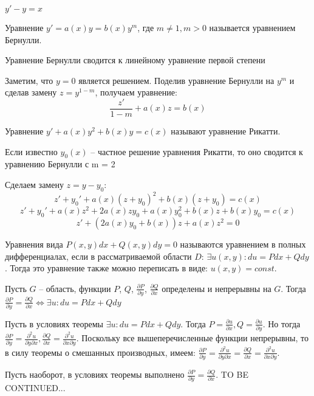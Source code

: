 \documentclass[document.tex]{subfiles}
\begin{document}
\begin{Example}
$y' - y = x$
\end{Example}
\begin{Definition}
Уравнение $y' = a(x)y = b(x)y^m$, где $m \neq 1, m > 0$ называется уравнением Бернулли.
\end{Definition}
\begin{Statement}
Уравнение Бернулли сводится к линейному уравнение первой степени
\end{Statement}
\begin{Proof}
Заметим, что $y = 0$ является решением. Поделив уравнение Бернулли на $y^m$ и сделав замену $z = y^{1-m}$, получаем уравнение:
$$\frac{z'}{1-m} + a(x)z = b(x)$$
\end{Proof}
\begin{Definition}
Уравнение $y' + a(x)y^2 + b(x)y = c(x)$ называют уравнение Рикатти.
\end{Definition}
\begin{Statement}
Если известно $y_0(x)$ -- частное решение уравнения Рикатти, то оно сводится к уравнению Бернулли с m = 2
\end{Statement}
\begin{Proof}
Сделаем замену $z = y - y_0$:
$$z' + y_0' + a(x)(z+y_0)^2 + b(x)(z+y_0) = c(x)$$
$$z' + y_0' + a(x)z^2 + 2a(x)zy_0 + a(x)y_0^2 + b(x)z + b(x)y_0 = c(x)$$
$$z' + (2a(x)y_0 + b(x))z + a(x)z^2 = 0$$
\end{Proof}
\begin{Definition}
Уравнения вида $P(x, y)dx + Q(x, y)dy = 0$ называются уравнением в полных дифференциалах, если в рассматриваемой области $D$: $\exists u(x, y): du = Pdx + Qdy$. Тогда это уравнение также можно переписать в виде: $u(x, y) = const$.
\end{Definition}
\begin{Theorem}
Пусть $G$ -- область, функции $P$, $Q$, $\frac{\partial P}{\partial y}$, $\frac{\partial Q}{\partial x}$ определены и непрерывны на $G$. Тогда $\frac{\partial P}{\partial y} = \frac{\partial Q}{\partial x} \Leftrightarrow \exists u : du = Pdx + Qdy$
\end{Theorem}
\begin{Proof}
Пусть в условиях теоремы $\exists u : du = Pdx+Qdy$. Тогда $P = \frac{\partial u}{\partial x},
Q = \frac{\partial u}{\partial y}$. Но тогда $\frac{\partial P}{\partial y} = \frac{\partial^2 u}{\partial y \partial x}, \frac{\partial Q}{\partial x} = \frac{\partial ^2 u}{\partial x \partial y}$. Поскольку все вышеперечисленные функции непрерывны, то в силу теоремы о смешанных производных, имеем: $\frac{\partial P}{\partial y} = \frac{\partial^2 u}{\partial y \partial x} = \frac{\partial Q}{\partial x} = \frac{\partial ^2 u}{\partial x \partial y}$.

Пусть наоборот, в условиях теоремы выполнено $\frac{\partial P}{\partial y} = \frac{\partial Q}{\partial x}$.
TO BE CONTINUED...
\end{Proof}
\end{document}

